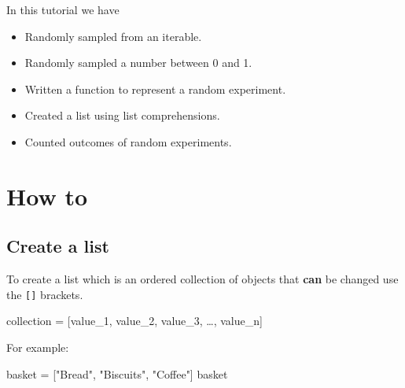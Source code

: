 \begin{note}
In this tutorial we have
\begin{itemize}
\item 

Randomly sampled from an iterable.

\item 

Randomly sampled a number between 0 and 1.

\item 

Written a function to represent a random experiment.

\item 

Created a list using list comprehensions.

\item 

Counted outcomes of random experiments.

\end{itemize}
\end{note}





\section{How to}
\label{\detokenize{tools-for-mathematics/06-probability/how/main:how-to}}\label{\detokenize{tools-for-mathematics/06-probability/how/main::doc}}

\subsection{Create a list}
\label{\detokenize{tools-for-mathematics/06-probability/how/main:create-a-list}}\label{\detokenize{tools-for-mathematics/06-probability/how/main:id1}}

To create a list which is an ordered collection of objects that \textbf{can} be
changed use the \texttt{{[}{]}} brackets.


\begin{pyin}
collection = [value_1, value_2, value_3, …, value_n]
\end{pyin}



For example:




\begin{pyin}
basket = ["Bread", "Biscuits", "Coffee"]
basket
\end{pyin}





